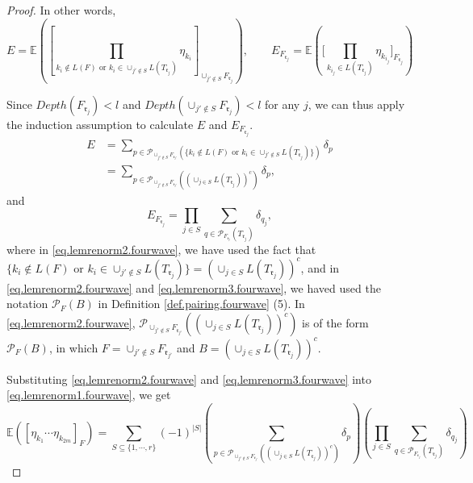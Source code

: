\begin{proof}
 
 In other words, 
 \begin{equation}
  E = \mathbb{E}\left(\left[\prod_{k_i\notin L(F)\text{ or }k_i\in \cup_{j'\notin S}L(T_{\mathfrak{r}_j})}\eta_{k_i}\right]_{\cup_{j'\notin S}F_{\mathfrak{r}_j}}\right), 
  \qquad 
  E_{F_{\mathfrak{r}_j}} = \mathbb{E}\left(\Bigg[\prod_{k_{i_{j}}\in L(T_{\mathfrak{r}_j})}\eta_{k_{i_j}}\Bigg]_{F_{\mathfrak{r}_j}}\right)
 \end{equation}
 
 Since $Depth(F_{\mathfrak{r}_j})<l$ and $Depth(\cup_{j'\notin S}F_{\mathfrak{r}_j})<l$ for any $j$, we can thus apply the induction assumption to calculate $E$ and $E_{F_{\mathfrak{r}_j}}$.
 \begin{equation}\label{eq.lemrenorm2.fourwave}
  \begin{split}
  E &= \sum_{p\in \mathcal{P}_{\cup_{j'\notin S} F_{\mathfrak{r}_{j'}}}(\{k_i\notin L(F)\text{ or }k_i\in \cup_{j'\notin S}L(T_{\mathfrak{r}_j})\})}\delta_p
  \\
  &= \sum_{p\in \mathcal{P}_{\cup_{j'\notin S} F_{\mathfrak{r}_{j'}}}((\cup_{j\in S}L(T_{\mathfrak{r}_j}))^c)}\delta_p,
  \end{split}
 \end{equation}
 and
 \begin{equation}\label{eq.lemrenorm3.fourwave}
  E_{F_{\mathfrak{r}_j}} = \prod_{j\in S}\sum_{q\in \mathcal{P}_{F_{\mathfrak{r}_j}}(T_{\mathfrak{r}_j})} \delta_{q_j},
 \end{equation}
 where in \eqref{eq.lemrenorm2.fourwave}, we have used the fact that $\{k_i\notin L(F)\text{ or }k_i\in \cup_{j'\notin S}L(T_{\mathfrak{r}_j})\} = (\cup_{j\in S}L(T_{\mathfrak{r}_j}))^c$, and in \eqref{eq.lemrenorm2.fourwave} and \eqref{eq.lemrenorm3.fourwave}, we haved used the notation $\mathcal{P}_{F}(B)$ in Definition \ref{def.pairing.fourwave} (5). In \eqref{eq.lemrenorm2.fourwave}, $\mathcal{P}_{\cup_{j'\notin S} F_{\mathfrak{r}_{j'}}}((\cup_{j\in S}L(T_{\mathfrak{r}_j}))^c)$ is of the form $\mathcal{P}_{F}(B)$, in which $F = \cup_{j'\notin S} F_{\mathfrak{r}_{j'}}$ and $B = (\cup_{j\in S}L(T_{\mathfrak{r}_j}))^c$.
 
 Substituting \eqref{eq.lemrenorm2.fourwave} and \eqref{eq.lemrenorm3.fourwave} into \eqref{eq.lemrenorm1.fourwave}, we get 
 \begin{equation}
  \mathbb{E}([\eta_{k_1}\cdots \eta_{k_{2m}}]_F) =\sum_{S\subseteq\{1,\cdots,r\}}(-1)^{|S|}
  \left(\sum_{p\in \mathcal{P}_{\cup_{j'\notin S} F_{\mathfrak{r}_{j'}}}((\cup_{j\in S}L(T_{\mathfrak{r}_j}))^c)}\delta_p\right)
  \left(\prod_{j\in S}\sum_{q\in \mathcal{P}_{F_{\mathfrak{r}_j}}(T_{\mathfrak{r}_j})} \delta_{q_j}\right)
 \end{equation}
 

\end{proof}
